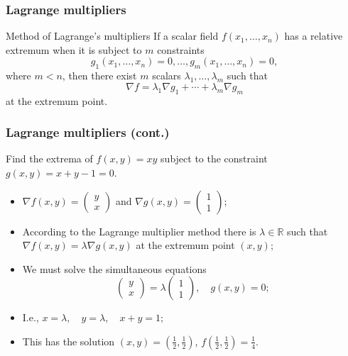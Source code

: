 \documentclass[aspectratio=169,handout]{beamer}
\newcommand{\bR}{\mathbb{R}} %
\begin{document}
\begin{frame}
    \frametitle{Lagrange multipliers}


    \begin{block}{Method of Lagrange's multipliers}
        If a scalar field \(f(x_1,\ldots,x_n)\) has a relative extremum when it is subject to \(m\) constraints
        \[
            g_1(x_1,\ldots,x_n) = 0,
            \dots , g_m(x_1,\ldots,x_n)=0,
        \]
        where \(m<n\), then there exist \(m\) scalars \(\lambda_1,\ldots,\lambda_m\) such that
        \[
            \nabla f = \lambda_1 \nabla g_1 + \cdots + \lambda_m \nabla g_m
        \]
        at the extremum point.
    \end{block}



\end{frame}



\begin{frame}
    \frametitle{Lagrange multipliers (cont.)}

    \begin{example}
        Find the extrema of \(f(x,y) = xy\) subject to the constraint \(g(x,y) = x+y-1 =0\).
        \begin{itemize}
            \item \(\nabla f(x,y) = \left(\begin{smallmatrix}
                      y\\ x
                  \end{smallmatrix}\right)\)
                  and \(\nabla g(x,y) = \left(\begin{smallmatrix}
                      1\\ 1
                  \end{smallmatrix}\right)\);
            \item  According to the Lagrange multiplier method there is \(\lambda\in \bR\) such that \(\nabla f(x,y) = \lambda \nabla g(x,y)\) at the extremum point \((x,y)\);
            \item We must solve the simultaneous equations
                  \[
                      \left(\begin{smallmatrix}
                              y\\ x
                          \end{smallmatrix}\right)
                      = \lambda \left(\begin{smallmatrix}
                              1\\ 1
                          \end{smallmatrix}\right),
                      \quad g(x,y) =0;
                  \]
            \item I.e.,
                  \( x = \lambda, \quad
                  y = \lambda, \quad
                  x+y = 1;
                  \)
            \item This has the solution \((x,y) = (\frac{1}{2},\frac{1}{2})\), \(f(\frac{1}{2},\frac{1}{2})= \frac{1}{4}\).
        \end{itemize}
    \end{example}

\end{frame}
\end{document}
